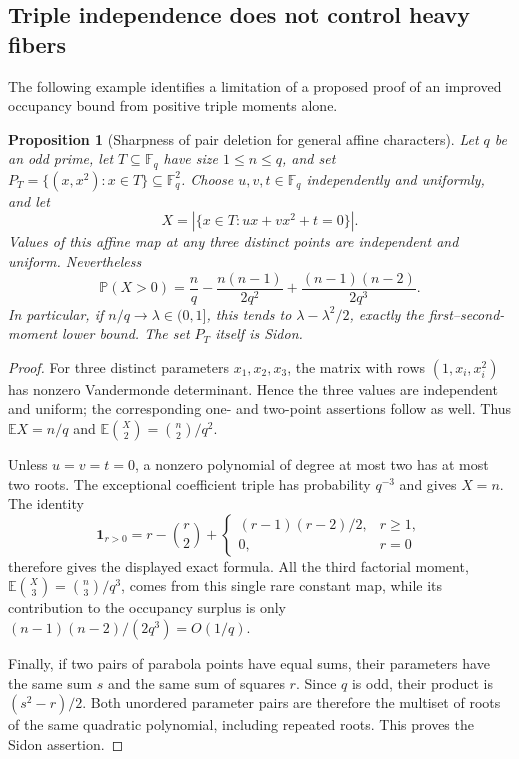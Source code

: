 \documentclass[11pt]{article}
\newtheorem{proposition}[theorem]{Proposition}
\theoremstyle{definition}
\theoremstyle{remark}
\newcommand{\F}{\mathbb F}
\newcommand{\E}{\mathbb E}
\newcommand{\Prob}{\mathbb P}
\begin{document}
\subsection{Triple independence does not control heavy fibers}

The following example identifies a limitation of a proposed proof of
an improved occupancy bound from positive triple moments alone.

\begin{proposition}[Sharpness of pair deletion for general affine characters]
\label{prop:finite-field-occupancy}
Let $q$ be an odd prime, let $T\subseteq\F_q$ have size $1\le n\le q$,
and set $P_T=\{(x,x^2):x\in T\}\subseteq\F_q^2$. Choose
$u,v,t\in\F_q$ independently and uniformly, and let
\[
X=|\{x\in T:ux+vx^2+t=0\}|.
\]
Values of this affine map at any three distinct points are independent
and uniform. Nevertheless
\[
\Prob(X>0)=\frac n q-\frac{n(n-1)}{2q^2}
+\frac{(n-1)(n-2)}{2q^3}.
\]
In particular, if $n/q\to\lambda\in(0,1]$, this tends to
$\lambda-\lambda^2/2$, exactly the first--second-moment lower bound.
The set $P_T$ itself is Sidon.
\end{proposition}
\begin{proof}
For three distinct parameters $x_1,x_2,x_3$, the matrix with rows
$(1,x_i,x_i^2)$ has nonzero Vandermonde determinant. Hence the three
values are independent and uniform; the corresponding one- and
two-point assertions follow as well. Thus
$\E X=n/q$ and $\E\binom X2=\binom n2/q^2$.

Unless $u=v=t=0$, a nonzero polynomial of degree at most two has at
most two roots. The exceptional coefficient triple has probability
$q^{-3}$ and gives $X=n$. The identity
\[
\mathbf1_{r>0}=r-\binom r2+
\begin{cases}(r-1)(r-2)/2,&r\ge1,\\0,&r=0\end{cases}
\]
therefore gives the displayed exact formula. All the third factorial
moment, $\E\binom X3=\binom n3/q^3$, comes from this single rare
constant map, while its contribution to the occupancy surplus is
only $(n-1)(n-2)/(2q^3)=O(1/q)$.

Finally, if two pairs of parabola points have equal sums, their
parameters have the same sum $s$ and the same sum of squares $r$.
Since $q$ is odd, their product is $(s^2-r)/2$. Both unordered
parameter pairs are therefore the multiset of roots of the same
quadratic polynomial, including repeated roots. This proves the
Sidon assertion.
\end{proof}
\end{document}
